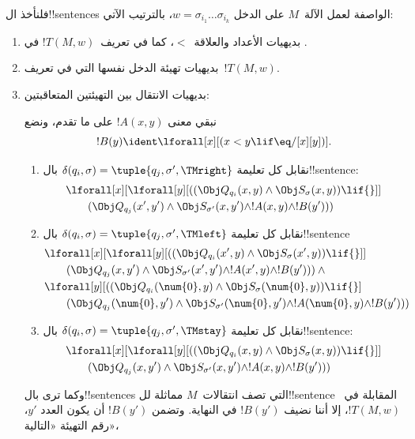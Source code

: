 \documentclass[../../../include/open-logic-section]{subfiles}
\begin{document}
فلنأخذ ال!!{sentence}s الواصفة لعمل الآلة~$M$ على الدخل
$w=\sigma_{i_1}\dots\sigma_{i_k}$، بالترتيب الآتي:
\begin{enumerate}
\item بديهيات الأعداد والعلاقة~$<$، كما في تعريف~$!T(M,w)$
في .
\item بديهيات تهيئة الدخل نفسها التي في تعريف~$!T(M,w)$.
\item بديهيات الانتقال بين التهيئتين المتعاقبتين:

نبقي معنى $!A(x,y)$ على ما تقدم، ونضع
\[
  !B(y) \ident \lforall[x][(x < y \lif \eq/[x][y])].
\]
\begin{enumerate}
\item {} نقابل كل تعليمة $\delta(q_i,\sigma)=
  \tuple{q_j,\sigma',\TMright}$ بال!!{sentence}:
\begin{align*}
& \lforall[x][\lforall[y][(
   (\Obj Q_{q_i}(x, y) \land \Obj S_{\sigma}(x, y)) \lif {}]] \\
&\qquad   (\Obj Q_{q_j}(x', y') \land \Obj S_{\sigma'}(x, y') \land
!A(x, y) \land !B(y')))
\end{align*}
\item {} نقابل كل تعليمة $\delta(q_i,\sigma)=
  \tuple{q_j,\sigma',\TMleft}$ بال!!{sentence}
\begin{align*}
& \lforall[x][\lforall[y][
    ((\Obj Q_{q_i}(x', y) \land \Obj S_{\sigma}(x', y)) \lif {}]]\\
& \qquad   (\Obj Q_{q_j}(x, y') \land \Obj S_{\sigma'}(x', y') \land
!A(x', y) \land !B(y'))) \land {}\\
& \lforall[y][((\Obj Q_{q_i}(\num{0}, y) \land \Obj S_{\sigma}(\num{0},
    y)) \lif {}]\\
& \qquad (\Obj Q_{q_j}(\num{0}, y') \land \Obj S_{\sigma'}(\num{0},
  y') \land !A(\num{0}, y) \land !B(y')))
\end{align*}
\item {} نقابل كل تعليمة $\delta(q_i,\sigma)=
  \tuple{q_j,\sigma',\TMstay}$ بال!!{sentence}:
\begin{align*}
& \lforall[x][\lforall[y][(
   (\Obj Q_{q_i}(x, y) \land \Obj S_{\sigma}(x, y)) \lif {}]] \\
&\qquad (\Obj Q_{q_j}(x, y') \land \Obj S_{\sigma'}(x, y') \land
!A(x, y) \land !B(y')))
\end{align*}
\end{enumerate}
وكما ترى بال!!{sentence}s التي تصف انتقالات~$M$ مماثلة
لل!!{sentence} المقابلة في~$!T(M,w)$، إلا أننا نضيف $!B(y')$ في
النهاية. وتضمن $!B(y')$ أن يكون العدد $y'$، رقم التهيئة «التالية»،

\end{enumerate}
\end{document}

